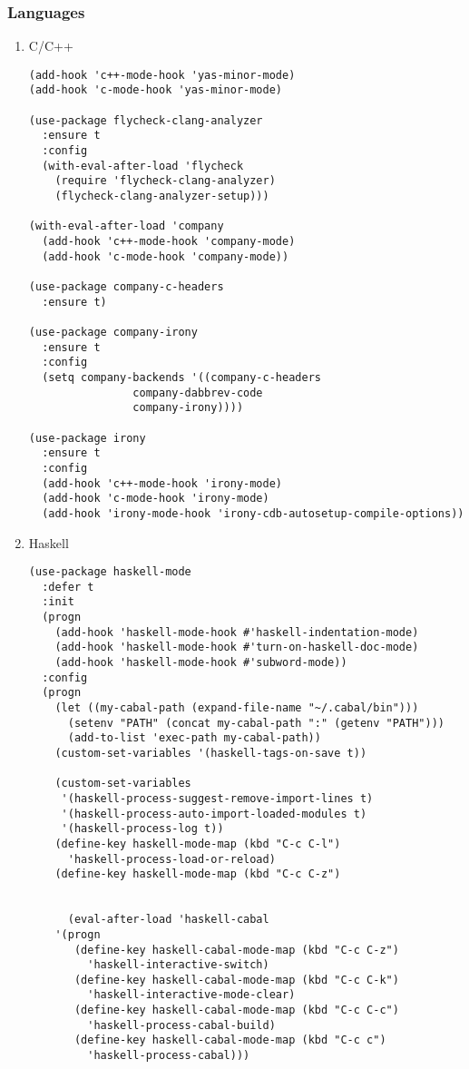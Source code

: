 \documentclass[11pt]{article}
\begin{document}
\subsubsection{Languages}
\label{sec:orgd6c1bd6}
\begin{enumerate}
\item C/C++
\label{sec:org654d05a}
\begin{verbatim}
(add-hook 'c++-mode-hook 'yas-minor-mode)
(add-hook 'c-mode-hook 'yas-minor-mode)

(use-package flycheck-clang-analyzer
  :ensure t
  :config
  (with-eval-after-load 'flycheck
    (require 'flycheck-clang-analyzer)
    (flycheck-clang-analyzer-setup)))

(with-eval-after-load 'company
  (add-hook 'c++-mode-hook 'company-mode)
  (add-hook 'c-mode-hook 'company-mode))

(use-package company-c-headers
  :ensure t)

(use-package company-irony
  :ensure t
  :config
  (setq company-backends '((company-c-headers
			    company-dabbrev-code
			    company-irony))))

(use-package irony
  :ensure t
  :config
  (add-hook 'c++-mode-hook 'irony-mode)
  (add-hook 'c-mode-hook 'irony-mode)
  (add-hook 'irony-mode-hook 'irony-cdb-autosetup-compile-options))
\end{verbatim}

\item Haskell
\label{sec:org2c42bae}

\begin{verbatim}
(use-package haskell-mode
  :defer t
  :init
  (progn
    (add-hook 'haskell-mode-hook #'haskell-indentation-mode)
    (add-hook 'haskell-mode-hook #'turn-on-haskell-doc-mode)
    (add-hook 'haskell-mode-hook #'subword-mode))
  :config
  (progn
    (let ((my-cabal-path (expand-file-name "~/.cabal/bin")))
      (setenv "PATH" (concat my-cabal-path ":" (getenv "PATH")))
      (add-to-list 'exec-path my-cabal-path))
    (custom-set-variables '(haskell-tags-on-save t))

    (custom-set-variables
     '(haskell-process-suggest-remove-import-lines t)
     '(haskell-process-auto-import-loaded-modules t)
     '(haskell-process-log t))
    (define-key haskell-mode-map (kbd "C-c C-l")
      'haskell-process-load-or-reload)
    (define-key haskell-mode-map (kbd "C-c C-z")


      (eval-after-load 'haskell-cabal
	'(progn
	   (define-key haskell-cabal-mode-map (kbd "C-c C-z")
	     'haskell-interactive-switch)
	   (define-key haskell-cabal-mode-map (kbd "C-c C-k")
	     'haskell-interactive-mode-clear)
	   (define-key haskell-cabal-mode-map (kbd "C-c C-c")
	     'haskell-process-cabal-build)
	   (define-key haskell-cabal-mode-map (kbd "C-c c")
	     'haskell-process-cabal)))


\end{verbatim}
\end{enumerate}
\end{document}
